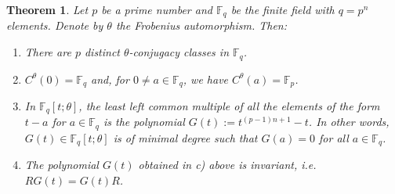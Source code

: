 \documentclass[10pt,a4paper]{amsart}
\newtheorem{theorem}{Theorem}
\begin{document}
\begin{theorem}
	\label{finite fields}	
	Let $p$ be a prime number and $\mathbb F_q$ be the finite field
	with $q=p^n$ elements.  Denote by $\theta$ the Frobenius
	automorphism.  Then:
	\begin{enumerate}
		\item[a)] There are $p$ distinct $\theta$-conjugacy classes in $\mathbb F_q$.
		\item[b)] $C^{\theta}(0)=\mathbb F_q$ and, for $0\ne a\in \mathbb F_q$, we have
		$C^{\theta}(a)=\mathbb F_p$.
		\item[c)] In $\mathbb F_q[t;\theta]$, the least left common multiple of all the elements
		of the form $t-a$ for $ a\in\mathbb F_q$ is the polynomial
		$G(t):=t^{(p-1)n +1}-t$.  In other words, $G(t)\in \mathbb
		F_q[t;\theta]$ is of minimal degree such that $G(a)=0$ for all
		$a\in \mathbb F_q$.
		\item[d)] The polynomial $G(t)$ obtained in c) above is invariant,
		i.e. $RG(t)=G(t)R$.
	\end{enumerate}
\end{theorem}
\end{document}
